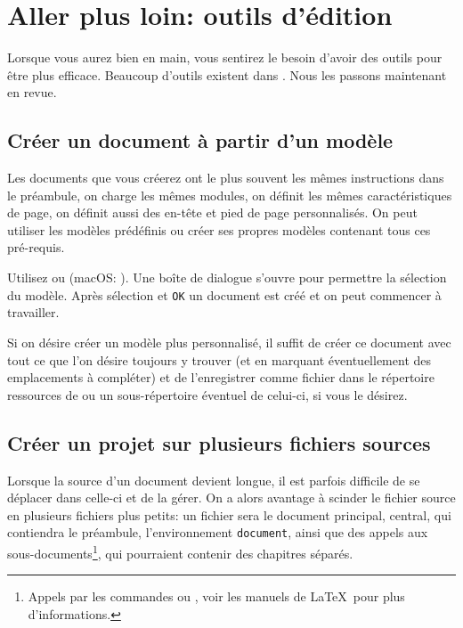 
\chapter{Aller plus loin: outils d'{\'e}dition}

Lorsque vous aurez \Tw{} bien en main, vous sentirez le besoin d'avoir des outils pour être plus efficace. Beaucoup d'outils existent dans \Tw{}. Nous les passons maintenant en revue.

\section{Créer un document à partir d'un modèle}

Les documents que vous créerez ont le plus souvent les mêmes instructions dans le préambule, on charge les mêmes modules, on définit les mêmes caractéristiques de page, on définit aussi des en-tête et pied de page personnalisés. On peut utiliser les modèles prédéfinis ou créer ses propres modèles contenant tous ces pré-requis.

Utilisez \submenu{} ou  (macOS: ). Une boîte de dialogue s'ouvre pour permettre la sélection du modèle. Après sélection et \verb|OK| un document est créé et on peut commencer à travailler.

Si on désire créer un modèle plus personnalisé, il suffit de créer ce document avec tout ce que l'on désire toujours y trouver (et en marquant éventuellement des emplacements à compléter) et de l'enregistrer comme fichier  dans le répertoire ressources de \Tw{}  ou un sous-répertoire éventuel de celui-ci, si vous le désirez.

\section{Créer un projet sur plusieurs fichiers sources}

Lorsque la source d'un document devient longue, il est parfois difficile de se déplacer dans celle-ci et de la gérer. On a alors avantage à scinder le fichier source en plusieurs fichiers plus petits: un fichier sera le document principal, central, qui contiendra le préambule, l'environnement \verb|document|, ainsi que des appels aux \og sous-documents\fg \footnote{Appels par les commandes \verb|| ou \verb||, voir les manuels de \LaTeX\ pour plus d'informations.}, qui pourraient contenir des chapitres séparés.

